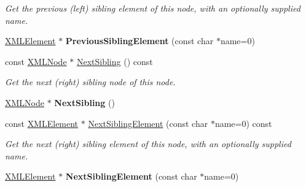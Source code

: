 \begin{DoxyCompactItemize}
\begin{DoxyCompactList}\small\item\em Get the previous (left) sibling element of this node, with an optionally supplied name. \end{DoxyCompactList}\item 
\hyperlink{classtinyxml2_1_1XMLElement}{X\+M\+L\+Element} $\ast$ {\bfseries Previous\+Sibling\+Element} (const char $\ast$name=0)\hypertarget{classtinyxml2_1_1XMLNode_ae4f37eb6cd405bdf1d57caa066e36d87}{}\label{classtinyxml2_1_1XMLNode_ae4f37eb6cd405bdf1d57caa066e36d87}

\item 
const \hyperlink{classtinyxml2_1_1XMLNode}{X\+M\+L\+Node} $\ast$ \hyperlink{classtinyxml2_1_1XMLNode_abba1df37581d89dccc45acdc55750ba2}{Next\+Sibling} () const \hypertarget{classtinyxml2_1_1XMLNode_abba1df37581d89dccc45acdc55750ba2}{}\label{classtinyxml2_1_1XMLNode_abba1df37581d89dccc45acdc55750ba2}

\begin{DoxyCompactList}\small\item\em Get the next (right) sibling node of this node. \end{DoxyCompactList}\item 
\hyperlink{classtinyxml2_1_1XMLNode}{X\+M\+L\+Node} $\ast$ {\bfseries Next\+Sibling} ()\hypertarget{classtinyxml2_1_1XMLNode_aeb7d4dfd8fb924ef86e7cb72183acbac}{}\label{classtinyxml2_1_1XMLNode_aeb7d4dfd8fb924ef86e7cb72183acbac}

\item 
const \hyperlink{classtinyxml2_1_1XMLElement}{X\+M\+L\+Element} $\ast$ \hyperlink{classtinyxml2_1_1XMLNode_ab66a0818d72cee86e0952ed2da701f8b}{Next\+Sibling\+Element} (const char $\ast$name=0) const \hypertarget{classtinyxml2_1_1XMLNode_ab66a0818d72cee86e0952ed2da701f8b}{}\label{classtinyxml2_1_1XMLNode_ab66a0818d72cee86e0952ed2da701f8b}

\begin{DoxyCompactList}\small\item\em Get the next (right) sibling element of this node, with an optionally supplied name. \end{DoxyCompactList}\item 
\hyperlink{classtinyxml2_1_1XMLElement}{X\+M\+L\+Element} $\ast$ {\bfseries Next\+Sibling\+Element} (const char $\ast$name=0)\hypertarget{classtinyxml2_1_1XMLNode_af1225412584d4a2126f55e96a12e0ec0}{}\label{classtinyxml2_1_1XMLNode_af1225412584d4a2126f55e96a12e0ec0}


\end{DoxyCompactItemize}
